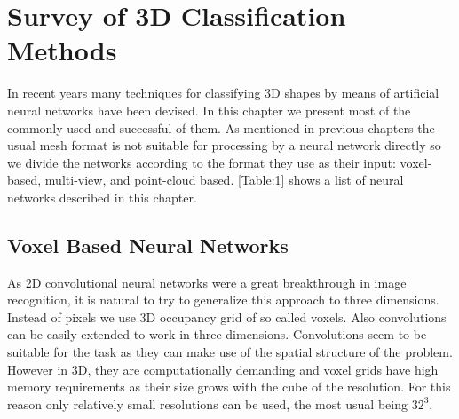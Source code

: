 \chapter{Survey of 3D Classification Methods}
\label{sec:chap3}
In recent years many techniques for classifying 3D shapes by means of artificial neural networks have been devised. In this chapter we present most of the commonly used and successful of them. As mentioned in previous chapters the usual mesh format is not suitable for processing by a neural network directly so we divide the networks according to the format they use as their input: voxel-based, multi-view, and point-cloud based. \autoref{Table:1} shows a list of neural networks described in this chapter.



\section{Voxel Based Neural Networks}
As 2D convolutional neural networks were a great breakthrough in image recognition, it is natural to try to generalize this approach to three dimensions. Instead of pixels we use 3D occupancy grid of so called voxels. Also convolutions can be easily extended to work in three dimensions. Convolutions seem to be suitable for the task as they can make use of the spatial structure of the problem. However in 3D, they are computationally demanding and voxel grids have high memory requirements as their size grows with the cube of the resolution. For this reason only relatively small resolutions can be used, the most usual being $32^3$. 

